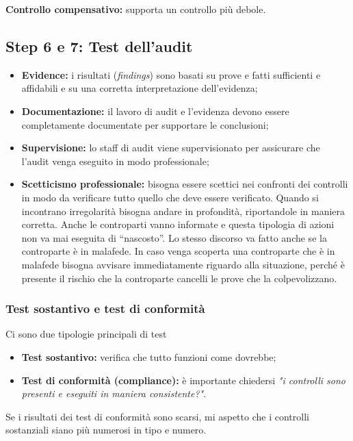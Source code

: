 \textbf{Controllo compensativo:} supporta un controllo più debole.

\subsection{Step 6 e 7: Test dell'audit}

\begin{itemize}
\item \textbf{Evidence:} i risultati (\emph{findings}) sono basati su prove e
fatti sufficienti e affidabili e su una corretta interpretazione dell'evidenza;

\item \textbf{Documentazione:} il lavoro di audit e l'evidenza
devono essere completamente documentate per supportare le conclusioni;

\item \textbf{Supervisione:} lo staff di audit viene supervisionato per
assicurare che l'audit venga eseguito in modo professionale;

\item \textbf{Scetticismo professionale:} bisogna essere scettici nei confronti
dei controlli in modo da verificare tutto quello che deve essere verificato.
Quando si incontrano irregolarità bisogna andare in profondità, riportandole
in maniera corretta. Anche le controparti vanno informate e questa tipologia di
azioni non va mai eseguita di ``nascosto''. Lo stesso discorso va fatto anche
se la controparte è in malafede. In caso venga scoperta una controparte che è in
malafede bisogna avvisare immediatamente riguardo alla situazione, perché è
presente il rischio che la controparte cancelli le prove che la colpevolizzano.
\end{itemize}

\subsubsection*{Test sostantivo e test di conformità}

Ci sono due tipologie principali di test
\begin{itemize}
\item \textbf{Test sostantivo:} verifica che tutto funzioni come dovrebbe;
\item \textbf{Test di conformità (compliance):} è importante chiedersi  \textit{
"i controlli sono presenti e eseguiti in maniera consistente?"}.
\end{itemize}

Se i risultati dei test di conformità sono scarsi, mi aspetto che i controlli
sostanziali siano più numerosi in tipo e numero.

